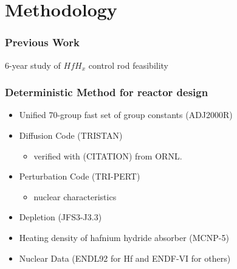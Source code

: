 \documentclass[9pt]{beamer}
\newcommand{\hfh}{$HfH_{x}$\xspace}
\begin{document}
\section{Methodology}


\begin{frame}
\frametitle{Previous Work}
6-year study of \hfh control rod feasibility
\begin{figure}[H]
\centering
{}
\end{figure}

\end{frame}


\begin{frame}
\frametitle{Deterministic Method for reactor design}
\begin{itemize}
\item Unified 70-group fast set of group constants (ADJ2000R) \cite{hazama_development_2002}
\item Diffusion Code (TRISTAN)
  \begin{itemize}
    \item verified with (CITATION) from \gls{ORNL}.
  \end{itemize}
\item Perturbation Code (TRI-PERT) 
  \begin{itemize}
  \item nuclear characteristics
  \end{itemize}
\item Depletion (JFS3-J3.3)
\item Heating density of hafnium hydride absorber (MCNP-5) \cite{mcnp_monte_2003}
\item Nuclear Data (ENDL92 for Hf and ENDF-VI for others)
\end{itemize}
\end{frame}
\end{document}
